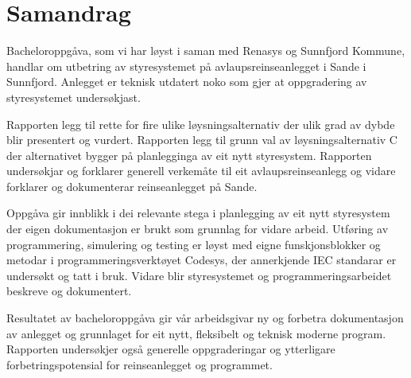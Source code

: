 \chapter{Samandrag}
\thispagestyle{romanpages}

Bacheloroppgåva, som vi har løyst i saman med \gls{Renasys} og \gls{Sunnfjord Kommune}, handlar om utbetring av styresystemet på 
avlaupsreinseanlegget i Sande i Sunnfjord. 
Anlegget er teknisk utdatert noko som gjer at oppgradering av styresystemet undersøkjast.

Rapporten legg til rette for fire ulike løysningsalternativ
der ulik grad av dybde blir presentert og vurdert. \newline
Rapporten legg til grunn val av løysningsalternativ C der alternativet bygger på planlegginga av eit nytt styresystem.
Rapporten undersøkjar og forklarer generell verkemåte til eit avlaupsreinseanlegg og 
vidare forklarer og dokumenterar reinseanlegget på Sande.

Oppgåva gir innblikk i dei relevante stega i planlegging av eit nytt styresystem der eigen dokumentasjon er brukt som grunnlag for vidare arbeid. 
Utføring av programmering, simulering og testing er løyst med eigne funskjonsblokker og metodar i programmeringsverktøyet \gls{Codesys},
der annerkjende \gls{IEC} standarar er undersøkt og tatt i bruk.
Vidare blir styresystemet og programmeringsarbeidet beskreve og dokumentert.

Resultatet av bacheloroppgåva gir vår arbeidsgivar ny og forbetra dokumentasjon av anlegget 
og grunnlaget for eit nytt, fleksibelt og teknisk moderne program. 
Rapporten undersøkjer også generelle oppgraderingar og ytterligare forbetringspotensial 
for reinseanlegget og programmet.